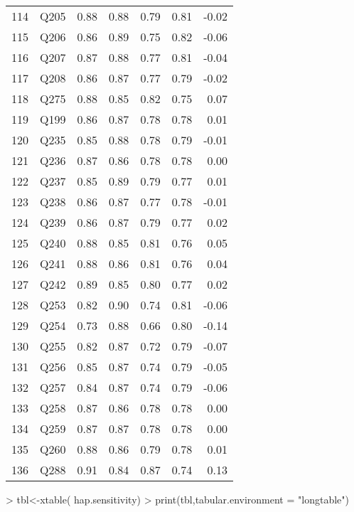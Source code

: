 \documentclass{amsart}
\begin{document}
\begin{table}[ht]
\begin{tabular}{rlrrrrr}
  114 & Q205 & 0.88 & 0.88 & 0.79 & 0.81 & -0.02 \\ 
  115 & Q206 & 0.86 & 0.89 & 0.75 & 0.82 & -0.06 \\ 
  116 & Q207 & 0.87 & 0.88 & 0.77 & 0.81 & -0.04 \\ 
  117 & Q208 & 0.86 & 0.87 & 0.77 & 0.79 & -0.02 \\ 
  118 & Q275 & 0.88 & 0.85 & 0.82 & 0.75 & 0.07 \\ 
  119 & Q199 & 0.86 & 0.87 & 0.78 & 0.78 & 0.01 \\ 
  120 & Q235 & 0.85 & 0.88 & 0.78 & 0.79 & -0.01 \\ 
  121 & Q236 & 0.87 & 0.86 & 0.78 & 0.78 & 0.00 \\ 
  122 & Q237 & 0.85 & 0.89 & 0.79 & 0.77 & 0.01 \\ 
  123 & Q238 & 0.86 & 0.87 & 0.77 & 0.78 & -0.01 \\ 
  124 & Q239 & 0.86 & 0.87 & 0.79 & 0.77 & 0.02 \\ 
  125 & Q240 & 0.88 & 0.85 & 0.81 & 0.76 & 0.05 \\ 
  126 & Q241 & 0.88 & 0.86 & 0.81 & 0.76 & 0.04 \\ 
  127 & Q242 & 0.89 & 0.85 & 0.80 & 0.77 & 0.02 \\ 
  128 & Q253 & 0.82 & 0.90 & 0.74 & 0.81 & -0.06 \\ 
  129 & Q254 & 0.73 & 0.88 & 0.66 & 0.80 & -0.14 \\ 
  130 & Q255 & 0.82 & 0.87 & 0.72 & 0.79 & -0.07 \\ 
  131 & Q256 & 0.85 & 0.87 & 0.74 & 0.79 & -0.05 \\ 
  132 & Q257 & 0.84 & 0.87 & 0.74 & 0.79 & -0.06 \\ 
  133 & Q258 & 0.87 & 0.86 & 0.78 & 0.78 & 0.00 \\ 
  134 & Q259 & 0.87 & 0.87 & 0.78 & 0.78 & 0.00 \\ 
  135 & Q260 & 0.88 & 0.86 & 0.79 & 0.78 & 0.01 \\ 
  136 & Q288 & 0.91 & 0.84 & 0.87 & 0.74 & 0.13 \\ 
   \hline
\end{tabular}
\end{table}
> tbl<-xtable( hap.sensitivity)
> print(tbl,tabular.environment = "longtable")
\end{document}
